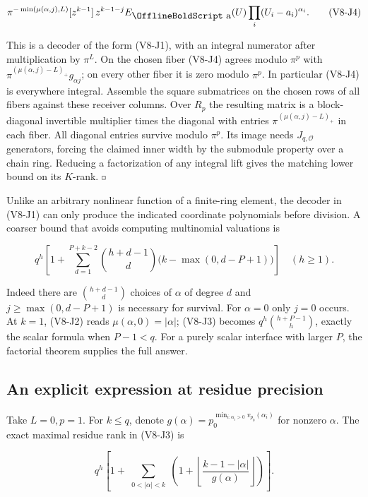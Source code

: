 \documentclass[11pt,a4paper]{article}
\renewcommand{\square}{\mathord{\vcenter{\hbox{\fboxsep=0pt\fboxrule=.4pt\fbox{\rule{0pt}{.7ex}\rule{.7ex}{0pt}}}}}}
\renewcommand{\boldsymbol}[1]{\mathord{\mathchoice
  {\hbox{\OfflineBoldText #1}}{\hbox{\OfflineBoldText #1}}
  {\hbox{\OfflineBoldScript #1}}{\hbox{\OfflineBoldScriptScript #1}}}}
\begin{document}
\[
 \pi^{-\min(\mu(\alpha,j),L)}
 [z^{k-1}]\,
 z^{k-1-j}E_{\boldsymbol a}(U)
              \prod_i(U_i-a_i)^{\alpha_i}.
                                                                    \tag{V8-J4}
\]

This is a decoder of the form (V8-J1), with an integral numerator after
multiplication by \(\pi^L\). On the chosen fiber (V8-J4) agrees modulo
\(\pi^p\) with \(\pi^{(\mu(\alpha,j)-L)_+}g_{\alpha j}\); on every other
fiber it is zero modulo \(\pi^p\). In particular (V8-J4) is everywhere
integral. Assemble the square submatrices on the chosen rows of all
fibers against these receiver columns. Over \(R_p\) the resulting matrix
is a block-diagonal invertible multiplier times the diagonal with
entries \(\pi^{(\mu(\alpha,j)-L)_+}\) in each fiber. All diagonal
entries survive modulo \(\pi^p\). Its image needs \(J_{q,\mathcal O}\)
generators, forcing the claimed inner width by the submodule property
over a chain ring. Reducing a factorization of any integral lift gives
the matching lower bound on its \(K\)-rank. \(\square\)

Unlike an arbitrary nonlinear function of a finite-ring element, the
decoder in (V8-J1) can only produce the indicated coordinate polynomials
before division. A coarser bound that avoids computing multinomial
valuations is

\[
 q^h\!\left[1+\sum_{d=1}^{P+k-2}{h+d-1\choose d}
                  \big(k-\max(0,d-P+1)\big)\right]\quad(h\ge1).       \tag{V8-J5}
\]

Indeed there are \({h+d-1\choose d}\) choices of \(\alpha\) of degree
\(d\) and \(j\ge\max(0,d-P+1)\) is necessary for survival. For
\(\alpha=0\) only \(j=0\) occurs. At \(k=1\), (V8-J2) reads
\(\mu(\alpha,0)=|\alpha|\); (V8-J3) becomes \(q^h{h+P-1\choose h}\),
exactly the scalar formula when \(P-1<q\). For a purely scalar interface
with larger \(P\), the factorial theorem supplies the full answer.

\subsection{An explicit expression at residue
precision}\label{v8-an-explicit-expression-at-residue-precision}

Take \(L=0,p=1\). For \(k\le q\), denote
\(g(\alpha)=p_0^{\min_{i:\alpha_i>0}v_{p_0}(\alpha_i)}\) for nonzero
\(\alpha\). The exact maximal residue rank in (V8-J3) is

\[
 q^h\left[1+\sum_{\substack{0<|\alpha|<k}}
       \left(1+\left\lfloor\frac{k-1-|\alpha|}{g(\alpha)}\right\rfloor\right)
                                                         \right].    \tag{V8-J6}
\]
\end{document}
